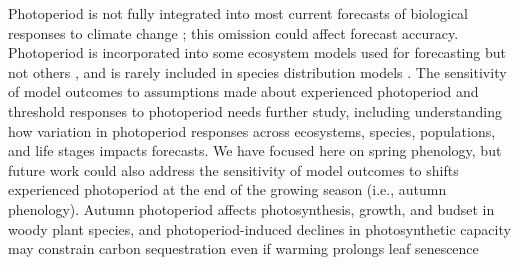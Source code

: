 \documentclass{article}
\begin{document}
\par Photoperiod is not fully integrated into most current forecasts of biological responses to climate change \citep[but see][for an example in insects]{tobin2008}; this omission could affect forecast accuracy. Photoperiod is incorporated into some ecosystem models \citep[e.g., the Ecosystem Demography model] []{jolly2005,medvigy2013} used for forecasting but not others \citep[e.g.,][]{richardson2012}, and is rarely included in species distribution models \citep[e.g.,] []{morin2009,zhu2012}. The sensitivity of model outcomes to assumptions made about experienced photoperiod and threshold responses to photoperiod needs further study, including understanding how variation in photoperiod responses across ecosystems, species, populations, and life stages impacts forecasts. 
We have focused here on spring phenology, but future work could also address the sensitivity of model outcomes to shifts experienced photoperiod at the end of the growing season (i.e., autumn phenology). Autumn photoperiod affects photosynthesis, growth, and budset in woody plant species, and photoperiod-induced declines in photosynthetic capacity may constrain carbon sequestration even if warming prolongs leaf senescence \citep[e.g.,][]{Howe:1996, bauerle2012,stinziano2017}
\end{document}
